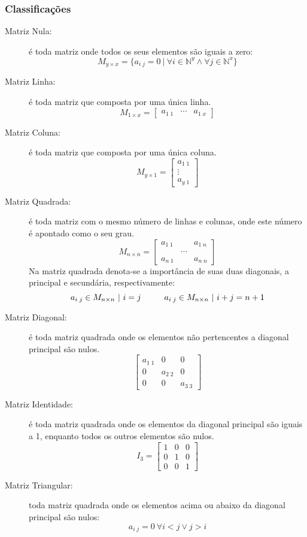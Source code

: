     \subsubsection{Classificações}
        \begin{description}
            \item[Matriz Nula:] é toda matriz onde todos os seus elementos são iguais a zero:
            \[ M_{y \times x} = \{a_{i \; j} = 0 \ | \ \forall i \in \mathbb{N}^y \wedge  \forall j \in \mathbb{N}^x \} \]
            \item[Matriz Linha:] é toda matriz que composta por uma única linha. \eg
            \[ M_{1 \times x} = \begin{bmatrix} a_{1 \; 1} & \cdots & a_{1 \; x} \end{bmatrix} \]
            \item[Matriz Coluna:] é toda matriz que composta por uma única coluna. \eg
            \[ M_{y \times 1} = \begin{bmatrix} a_{1 \; 1} \\ \vdots \\ a_{y \; 1} \end{bmatrix} \]
            \item[Matriz Quadrada:] é toda matriz com o mesmo número de linhas e colunas, onde este número é apontado como o seu grau. \eg
            \[ M_{n \times n} = \begin{bmatrix} a_{1 \; 1} & & a_{1 \; n} \\ & \cdots & \\ a_{n \; 1} &  & a_{n \; n} \end{bmatrix} \]
            Na matriz quadrada denota-se a importância de suas duas diagonais, a principal e secundária, respectivamente:
            \[ a_{i \; j} \in M_{n \times n} \ | \ i = j \hphantom{---} a_{i \; j} \in M_{n \times n} \ | \ i + j = n + 1 \]
            \item[Matriz Diagonal:] é toda matriz quadrada onde os elementos não pertencentes a diagonal principal são nulos. \eg
            \[ \begin{bmatrix} a_{1 \; 1} & 0 & 0 \\ 0 & a_{2 \; 2} & 0 \\ 0 & 0 & a_{3 \; 3} \end{bmatrix} \]
            \item[Matriz Identidade:] é toda matriz quadrada onde os elementos da diagonal principal são iguais a 1, enquanto todos os outros elementos são nulos. \eg
            \[ I_3 = \begin{bmatrix} 1 & 0 & 0 \\ 0 & 1 & 0 \\ 0 & 0 & 1 \end{bmatrix} \]
            \item[Matriz Triangular:] toda matriz quadrada onde os elementos acima ou abaixo da diagonal principal são nulos:
            \[ a_{i \; j} = 0 \ \forall i < j \vee j > i \]
        \end{description}

